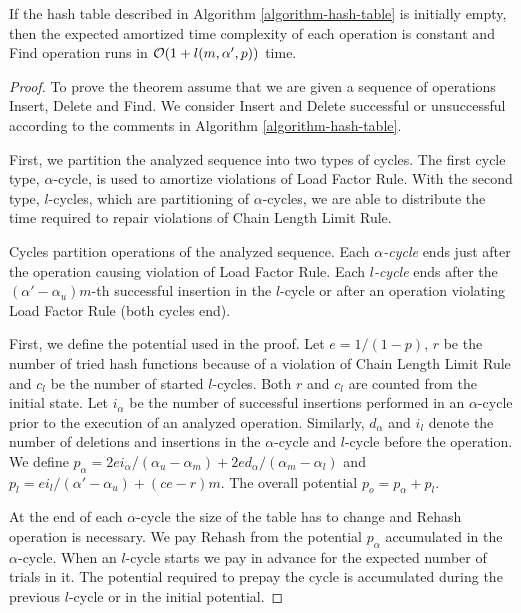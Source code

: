 \begin{theorem}
\label{theorem-amortised-expected-time}
If the hash table described in Algorithm \ref{algorithm-hash-table} is initially empty, then the expected amortized time complexity of each operation is constant and Find operation runs in $\mathcal{O}(1 + l(m, \alpha', p))$ time.
\end{theorem}
\begin{proof}
To prove the theorem assume that we are given a sequence of operations Insert, Delete and Find. 
We consider Insert and Delete successful or unsuccessful according to the comments in Algorithm \ref{algorithm-hash-table}.

First, we partition the analyzed sequence into two types of cycles. 
The first cycle type, $\alpha$-cycle, is used to amortize violations of Load Factor Rule. 
With the second type, $l$-cycles, which are partitioning of $\alpha$-cycles, we are able to distribute the time required to repair violations of Chain Length Limit Rule.

\begin{definition}
Cycles partition operations of the analyzed sequence.
Each \emph{$\alpha$-cycle} ends just after the operation causing violation of Load Factor Rule.
Each \emph{$l$-cycle} ends after the $(\alpha'-\alpha_u)m$-th successful insertion in the $l$-cycle or after an operation violating Load Factor Rule (both cycles end).
\end{definition}

First, we define the potential used in the proof.
Let $e = 1/(1 - p)$, $r$ be the number of tried hash functions because of a violation of Chain Length Limit Rule and $c_l$ be the number of started $l$-cycles.
Both $r$ and $c_l$ are counted from the initial state.
Let $i_\alpha$ be the number of successful insertions performed in an $\alpha$-cycle prior to the execution of an analyzed operation.
Similarly, $d_\alpha$ and $i_l$ denote the number of deletions and insertions in the $\alpha$-cycle and $l$-cycle before the operation.
We define $p_\alpha = {2ei_{\alpha}}/{(\alpha_u - \alpha_m)} + {2ed_{\alpha}}/{(\alpha_m - \alpha_l)}$ and $p_l = {ei_{l}}/{(\alpha' - \alpha_u)} + (ce - r) m$.
The overall potential $p_o = p_\alpha + p_l$.

At the end of each $\alpha$-cycle the size of the table has to change and Rehash operation is necessary.
We pay Rehash from the potential $p_\alpha$ accumulated in the $\alpha$-cycle.
When an $l$-cycle starts we pay in advance for the expected number of trials in it.
The potential required to prepay the cycle is accumulated during the previous $l$-cycle or in the initial potential.


\end{proof}
